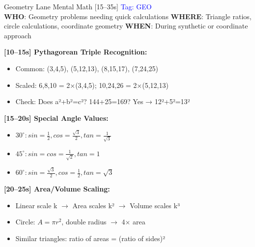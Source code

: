 \documentclass{article}
\begin{document}
\begin{mentalbox}{Geometry Lane Mental Math [15--35s]}
{\footnotesize\textcolor{timegreen}{}}\quad\textcolor{blue}{Tag: GEO}\\
\textbf{WHO}: Geometry problems needing quick calculations
\textbf{WHERE}: Triangle ratios, circle calculations, coordinate geometry
\textbf{WHEN}: During synthetic or coordinate approach

\textbf{[10--15s] Pythagorean Triple Recognition:}
\begin{itemize}[nosep]
\item Common: (3,4,5), (5,12,13), (8,15,17), (7,24,25)
\item Scaled: 6,8,10 = 2×(3,4,5); 10,24,26 = 2×(5,12,13)
\item Check: Does a²+b²=c²? 144+25=169? Yes → 12²+5²=13²
\end{itemize}

\textbf{[15--20s] Special Angle Values:}
\begin{itemize}[nosep]
\item $30^\circ: sin=\frac{1}{2}, cos=\frac{\sqrt{3}}{2}, tan=\frac{1}{\sqrt{3}}$
\item $45^\circ: sin=cos=\frac{1}{\sqrt{2}}, tan=1$
\item $60^\circ: sin=\frac{\sqrt{3}}{2}, cos=\frac{1}{2}, tan=\sqrt{3}$
\end{itemize}

\textbf{[20--25s] Area/Volume Scaling:}
\begin{itemize}[nosep]
\item Linear scale k $\rightarrow$ Area scales k² $\rightarrow$ Volume scales k³
\item Circle: $A=\pi r^2$, double radius $\rightarrow$ 4× area
\item Similar triangles: ratio of areas = (ratio of sides)²
\end{itemize}
\end{mentalbox}
\end{document}
